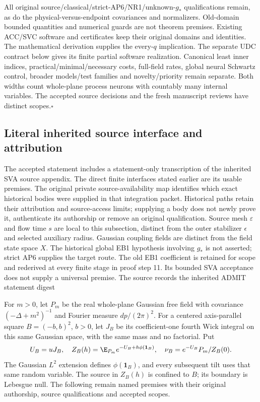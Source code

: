 All original source/classical/strict-AP6/NR1/unknown-$g_*$ qualifications
remain, as do the physical-versus-endpoint covariances and normalizers.
Old-domain bounded quantities and numerical guards are not theorem premises.
Existing ACC/SVC software and certificates keep their original domains
and identities. The mathematical derivation supplies the every-$q$ implication.
The separate UDC contract below gives its finite partial software realization.
Canonical least inner indices, practical/minimal/necessary costs, full-field
rates, global neural Schwartz control, broader models/test families and
novelty/priority remain separate. Both widths count whole-plane process
neurons with countably many internal variables. The accepted source decisions
and the fresh manuscript reviews have distinct scopes.\hfill$\square$


\subsection{Literal inherited source interface and attribution}
\label{uda:source}
The accepted statement includes a statement-only transcription of the
inherited SVA source appendix. The direct finite interfaces stated earlier
are its usable premises. The original private source-availability map identifies
which exact historical bodies were supplied in that integration packet.
Historical paths retain their attribution and source-access limits; supplying
a body does not newly prove it, authenticate its authorship or remove an
original qualification.
Source mesh $\varepsilon$ and flow time $s$ are local to this subsection,
distinct from the outer stabilizer $\epsilon$ and selected auxiliary radius.
Gaussian coupling fields are distinct from the field state space $X$.
The historical global EB1 hypothesis involving $g_*$ is not asserted;
strict AP6 supplies the target route. The old EB1 coefficient is retained
for scope and rederived at every finite stage in proof step 11.
Its bounded SVA acceptance does not supply a universal premise.
The source records the inherited ADMIT statement digest
\par{}\par

For $m>0$, let $P_m$ be the real whole-plane Gaussian free field with
covariance $(-\Delta+m^2)^{-1}$ and Fourier measure $dp/(2\pi)^2$.
For a centered axis-parallel square $B=(-b,b)^2$, $b>0$, let $J_B$ be its
coefficient-one fourth Wick integral on this same Gaussian space, with the
same mass and no factorial. Put
\[
 U_B=uJ_B,\quad Z_B(h)=\E_{P_m}e^{-U_B+h\phi(\mathbf1_B)},\quad
 \nu_B=e^{-U_B}P_m/Z_B(0).
\]
The Gaussian $L^2$ extension defines $\phi(\mathbf1_B)$, and every subsequent
tilt uses that same random variable. The source in $Z_B(h)$ is confined to
$B$; its boundary is Lebesgue null. The following remain named premises
with their original authorship, source qualifications and accepted scopes.

